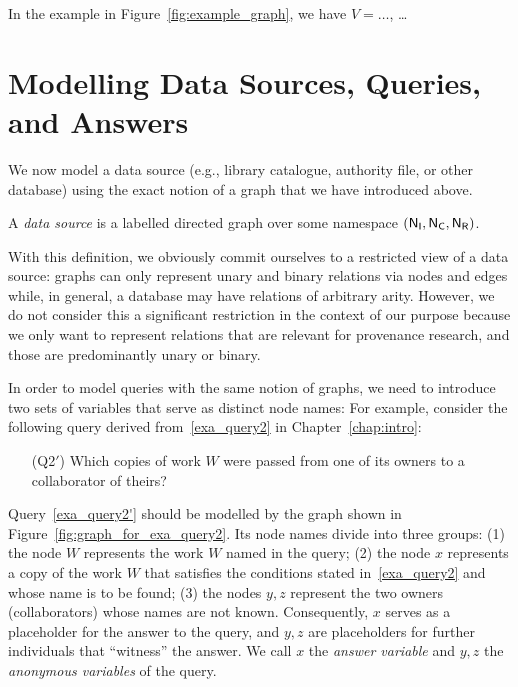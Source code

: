 In the example in Figure~\ref{fig:example_graph},
we have $V = \dots$, \dots{}

\section{Modelling Data Sources, Queries, and Answers}

We now model a data source (e.g., library catalogue, authority file, or other database)
using the exact notion of a graph that we have introduced above.
%
\begin{definition}
  A \emph{data source} is a labelled directed graph
  over some namespace $(\mathsf{N}_\mathsf{I},\mathsf{N}_\mathsf{C},\mathsf{N}_\mathsf{R})$.
\end{definition}
%
With this definition, we obviously commit ourselves to a restricted view of a data source:
graphs can only represent unary and binary relations via nodes and edges
while, in general, a database may have relations of arbitrary arity.
However, we do not consider this a significant restriction in the context of our purpose
because we only want to represent relations that are relevant for provenance research,
and those are predominantly unary or binary. 

In order to model queries with the same notion of graphs, we need to introduce
two sets of variables that serve as distinct node names:
For example, consider the following query derived from~\ref{exa_query2} in Chapter~\ref{chap:intro}:
%
\begin{enumerate}
  \item[(Q2$'$)]
    \label{exa_query2'}
    Which copies of work $W$ were passed from one of its owners to a collaborator of theirs?
\end{enumerate}
%
Query~\ref{exa_query2'}
should be modelled by the graph shown in Figure~\ref{fig:graph_for_exa_query2}.
Its node names divide into three groups:
(1) the node $W$ represents the work $W$ named in the query;
(2) the node $x$ represents a copy of the work $W$ that satisfies the conditions stated in~\ref{exa_query2} and
whose name is to be found;
(3) the nodes $y,z$ represent the two owners (collaborators) whose names are not known.
Consequently, $x$ serves as a placeholder for the answer to the query,
and $y,z$ are placeholders for further individuals that ``witness'' the answer.
We call $x$ the \emph{answer variable} and $y,z$ the \emph{anonymous variables}
of the query.

